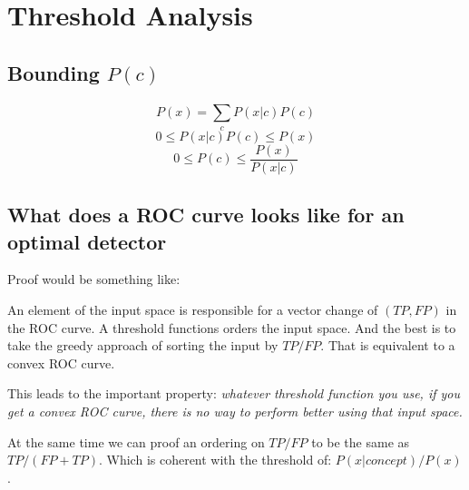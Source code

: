 \documentclass[a4paper]{article}
\begin{document}
\clearpage
\section{Threshold Analysis}
\label{sec:threshold-analysis}

\subsection{Bounding $P(c)$}

\begin{equation}P(x) = \sum_{c}^{} P(x|c) P(c)\end{equation}
\begin{equation}0 \le P(x|c) P(c) \le P(x)\end{equation}
\begin{equation}0 \le P(c) \le \frac{P(x)}{P(x|c)}\end{equation}


\subsection{What does a ROC curve looks like for an optimal detector}

Proof would be something like:

An element of the input space is responsible for a vector change of $(TP, FP)$ in the ROC
curve.
A threshold functions orders the input space.
And the best is to take the greedy approach of sorting the input by $TP/FP$.
That is equivalent to a convex ROC curve.

This leads to the important property:
\emph{whatever threshold function you use,
if you get a convex ROC curve, there is no way to perform better using that input space.}

At the same time we can proof an ordering on $TP/FP$ to be the same as $TP/(FP+TP)$.
Which is coherent with the threshold of: $P(x|concept)/P(x)$.
\end{document}
